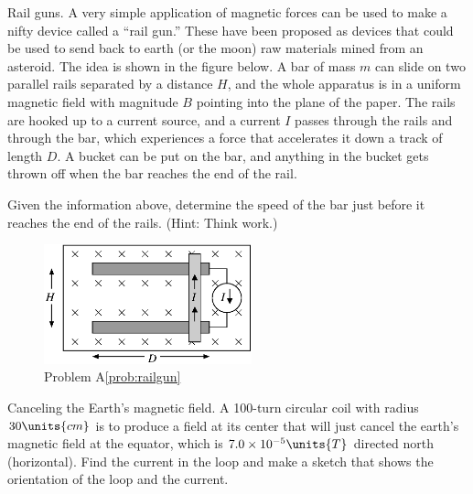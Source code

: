 \newpage

\begin{aproblem}{Rail guns.}  
  A very simple application of magnetic forces can be used to make a
  nifty device called a ``rail gun.'' These have been proposed as
  devices that could be used to send back to earth (or the moon) raw
  materials mined from an asteroid.  The idea is shown in the figure
  below.  A bar of mass $m$ can slide on two parallel rails separated
  by a distance $H$, and the whole apparatus is in a uniform magnetic
  field with magnitude $B$ pointing into the plane of the paper.  The
  rails are hooked up to a current source, and a current $I$ passes
  through the rails and through the bar, which experiences a force
  that accelerates it down a track of length $D$.  A bucket can be put
  on the bar, and anything in the bucket gets thrown off when the bar
  reaches the end of the rail.

  Given the information above, determine the speed of the bar just
  before it reaches the end of the rails.  (Hint: Think work.)
  \label{prob:railgun}
  \begin{figure}[h]
    \begin{center}
      \includegraphics[width=6cm]{additional_problems/railgun}
      \caption{Problem A\ref{prob:railgun}}
    \end{center}
  \end{figure}
\end{aproblem}

\begin{aproblem}{Canceling the Earth's magnetic field.}  
  A 100-turn circular coil with radius $30\units{cm}$ is to produce a
  field at its center that will just cancel the earth's magnetic field
  at the equator, which is $7.0 \times 10^{-5}\units{T}$ directed
  north (horizontal). Find the current in the loop and make a sketch
  that shows the orientation of the loop and the current.
\end{aproblem}


